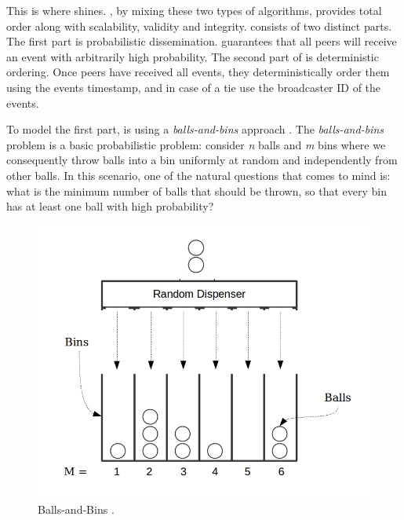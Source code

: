 \par
This is where \epto shines.  \epto, by mixing these two types of algorithms,  provides total order along with scalability, validity and integrity. 
\epto consists of two distinct parts. The first part is probabilistic dissemination. \epto guarantees that all peers will receive an event with arbitrarily high probability. The second part of \epto is deterministic ordering. Once peers have received all events, they deterministically order them using the events timestamp, and in case of a tie use the broadcaster ID of the events. 
\par
To model the first part, \epto is using a \textit{balls-and-bins} approach \autocite{Koldehofe02simplegossiping}. The \textit{balls-and-bins} problem is a basic probabilistic problem: consider \textit{n} balls and \textit{m} bins where we consequently throw balls into a bin uniformly at random and independently from other balls. In this scenario, one of the natural questions that comes to mind is: what is the minimum number of balls that should be thrown, so that every bin has at least one ball with high probability?
\begin{figure}
	\includegraphics[width=\linewidth]{figures/BnB.jpeg}
	\caption{Balls-and-Bins \autocite{bnb}.}
	\label{fig:balls-and-bins}
\end{figure}
